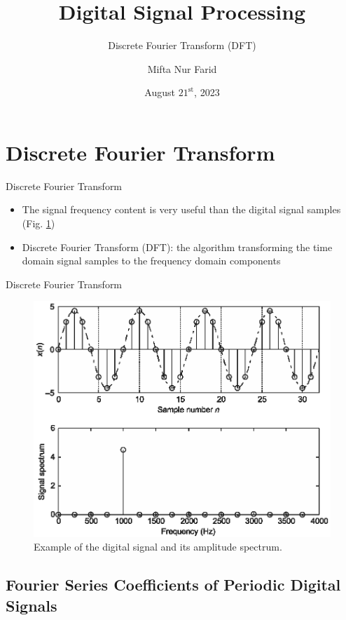 \documentclass[pdflatex,compress,mathserif]{beamer}
\title{Digital Signal Processing}
\subtitle{Discrete Fourier Transform (DFT)}
\author{Mifta Nur Farid}
\date{August $\text{21}^\text{st}$, 2023}
\begin{document}
\maketitle

\section{Discrete Fourier Transform}

\begin{frame}{Discrete Fourier Transform}
    \begin{itemize}
        \item The signal frequency content is very useful than the digital signal samples (Fig. \ref{fig:04.01})
        \item Discrete Fourier Transform (DFT): the algorithm transforming the time domain signal samples to the frequency domain components
        
    \end{itemize}
\end{frame}

\begin{frame}{Discrete Fourier Transform}
    \begin{figure}
        \includegraphics[width=0.7\linewidth]{fig/fig.4.01}
        \caption{Example of the digital signal and its amplitude spectrum.}
        \label{fig:04.01}
    \end{figure}
\end{frame}

\subsection{Fourier Series Coefficients of Periodic Digital Signals}
\end{document}

